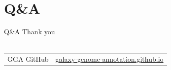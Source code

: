 \documentclass[12pt]{phage3slides} %
\begin{document}
\section{Q\&A}
\begin{frame}{Q\&A}
    Thank you \\\ \\
    \begin{center}
        \begin{tabular}{rl}
            \color{gray} GGA GitHub       & \href{https://galaxy-genome-annotation.github.io/}{galaxy-genome-annotation.github.io}\\
            \end{tabular}\\[1cm]
            \fundingNSFABIannotation
    \end{center}
\end{frame}
\end{document}
